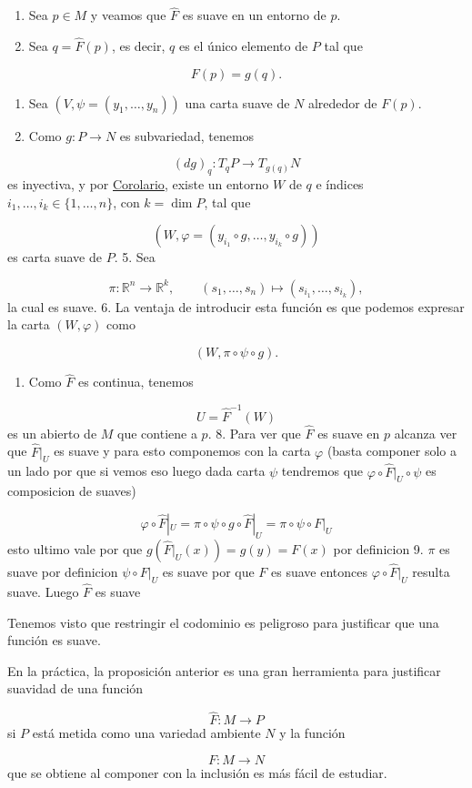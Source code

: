 \begin{bookproof}{}
\begin{enumerate}
\item Sea $p\in M$ y veamos que $\widehat F$ es suave en un entorno de $p$.
\item Sea $q=\widehat F(p)$, es decir, $q$ es el único elemento de $P$ tal que
\end{enumerate}
\[
F(p)=g(q).
\]
\begin{enumerate}[start=3]
\item Sea $(V,\psi=(y_1,\ldots,y_n))$ una carta suave de $N$ alrededor de $F(p)$.
\item Como $g:P\to N$ es subvariedad, tenemos
\end{enumerate}
\[
(dg)_q:T_qP\to T_{g(q)}N
\]
es inyectiva, y por \hyperref[blk:c4d494]{Corolario}, existe un entorno $W$ de $q$ e índices $i_1,\ldots,i_k\in\{1,\ldots,n\}$, con $k=\dim P$, tal que

\[
(W,\varphi=(y_{i_1}\circ g,\ldots,y_{i_k}\circ g))
\]
es carta suave de $P$. 5. Sea

\[
\pi:\mathbb R^n\to\mathbb R^k,\qquad (s_1,\ldots,s_n)\mapsto (s_{i_1},\ldots,s_{i_k}),
\]
la cual es suave. 6. La ventaja de introducir esta función es que podemos expresar la carta $(W,\varphi)$ como

\[
(W,\pi\circ\psi\circ g).
\]
\begin{enumerate}[start=7]
\item Como $\widehat F$ es continua, tenemos
\end{enumerate}
\[
U=\widehat F^{-1}(W)
\]
es un abierto de $M$ que contiene a $p$. 8. Para ver que $\widehat{F}$ es suave en $p$ alcanza ver que $\widehat{F}|_{U}$ es suave y para esto componemos con la carta $\varphi$ (basta componer solo a un lado por que si vemos eso luego dada carta $\psi$ tendremos que $\varphi\circ\widehat{F}|_{U}\circ\psi$ es composicion de suaves)

\[
\varphi\circ\widehat{F}|_{U}=\pi\circ\psi\circ g\circ\widehat{F}|_{U}=\pi\circ\psi\circ F|_{U}
\]
esto ultimo vale por que $g(\widehat{F}|_{U}(x))=g(y)=F(x)$ por definicion 9. $\pi$ es suave por definicion $\psi\circ F|_{U}$ es suave por que $F$ es suave entonces $\varphi\circ\widehat{F}|_{U}$ resulta suave. Luego $\widehat{F}$ es suave

\bookqed
\end{bookproof}
\label{blk:1258d0}
\begin{bookremark}{}
Tenemos visto que restringir el codominio es peligroso para justificar que una función es suave.

En la práctica, la proposición anterior es una gran herramienta para justificar suavidad de una función

\[
\widehat F:M\to P
\]
si $P$ está metida como una variedad ambiente $N$ y la función

\[
F:M\to N
\]
que se obtiene al componer con la inclusión es más fácil de estudiar.

\end{bookremark}
